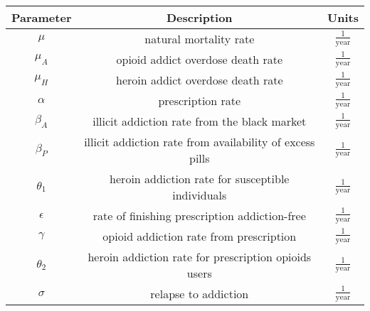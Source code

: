 \documentclass[12pt]{article}
\begin{document}
\pagebreak
\begin{center}
\begin{tabular}{|c | c | c | }

 \hline

{Parameter} & {Description} & {Units} \\ [0.5ex]

 \hline\hline
 
 $\mu$ &  natural mortality rate & $\frac{1}{\text{year}}$ \\

 \hline

 $\mu_A$ & opioid addict overdose death rate & $\frac{1}{\text{year}}$\\

 \hline
 
 $\mu_H$ &  heroin addict overdose death rate & $\frac{1}{\text{year}}$ \\

 \hline

$\alpha$ &  prescription rate & $\frac{1}{\text{year}}$    \\

 \hline

$\beta_A$ & illicit addiction rate from the black market & $\frac{1}{\text{year}}$  \\

\hline

$\beta_P$ &  illicit addiction rate from availability of excess pills & $\frac{1}{\text{year}}$  \\

\hline

$\theta_1$&  heroin addiction rate for susceptible individuals & $\frac{1}{\text{year}}$   \\

\hline

$\epsilon$ &  rate of finishing prescription addiction-free & $\frac{1}{\text{year}}$ \\

\hline

$\gamma$ &  opioid addiction rate from prescription & $\frac{1}{\text{year}}$ \\

\hline

$\theta_2$ &  heroin addiction rate for prescription opioids users & $\frac{1}{\text{year}}$  \\

\hline

$\sigma$ &  relapse to addiction & $\frac{1}{\text{year}}$  \\


\end{tabular}
\end{center}
\end{document}
